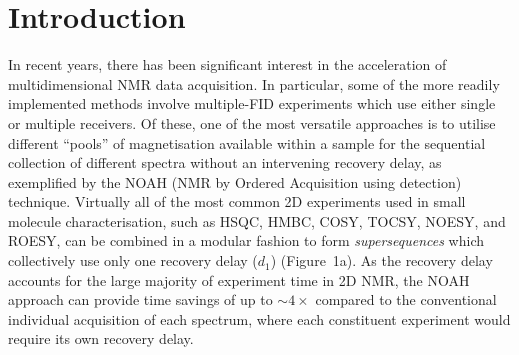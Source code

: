 \documentclass[final,twocolumn]{elsarticle}
\newcommand*{\proton}{\ce{^{1}H}}
\begin{document}
\section{Introduction}

In recent years, there has been significant interest in the acceleration of multidimensional NMR data acquisition.\cite{Schanda2005JBNMR, Schanda2006JACS, Kupce2007MRC, Schanda2009PNMRS, Furrer2010CC, Vitorge2010JMR, SchulzeSunninghausen2014JACS, SchulzeSunninghausen2017JMR, Koos2019JMR, Becker2019JMR, Frydman2002PNASUSA, Pelupessy2003JACS, Frydman2003JACS, Giraudeau2014ARAC, Gal2006JACS, Giraudeau2009JACS, Herrera2009ACIE, Pardo2012JACS, Donovan2013ACIE, Dumez2018PNMRS, Gouilleux2018ARNMRS, Sattler1995JBNMR, Nolis2006MRC, Nolis2007ACIE, Perez-Trujillo2007MRC, Parella2010CMR, Nolis2019JMR_TS, Kupce2006JACS, Kupce2008JACS, Kupce2010JMR, Kupce2010MRC, Pudakalakatti2014JBNMR, Pudakalakatti2015JCS, Kovacs2016MRC, Motiram-Corral2018CC, Kakita2018JMR, Nagy2019CC, Nolis2019CPC, Nolis2019JMR, Nolis2019MRC, Kakita2020RSCA, Nagy2020JMR, Kupce2021PNMRS}
In particular, some of the more readily implemented methods involve multiple-FID experiments which use either single or multiple receivers.
Of these, one of the most versatile approaches is to utilise different ``pools'' of magnetisation available within a sample for the sequential collection of different spectra without an intervening recovery delay, as exemplified by the NOAH (NMR by Ordered Acquisition using \proton{} detection) technique.\cite{Kupce2017ACIE, Kupce2018CC, Claridge2019MRC, Kupce2019JMR, Kupce2021PNMRS, Kupce2021NRMP}
Virtually all of the most common 2D experiments used in small molecule characterisation, such as HSQC, HMBC, COSY, TOCSY, NOESY, and ROESY, can be combined in a modular fashion to form \textit{supersequences} which collectively use only one recovery delay ($d_1$) (Figure~1a).
As the recovery delay accounts for the large majority of experiment time in 2D NMR, the NOAH approach can provide time savings of up to $\sim 4\times$ compared to the conventional individual acquisition of each spectrum, where each constituent experiment would require its own recovery delay.
\end{document}
